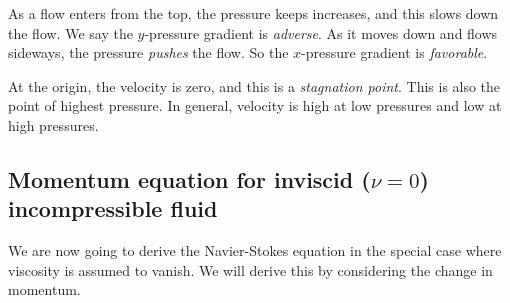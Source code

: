 \documentclass[a4paper]{article}
\begin{document}
\begin{eg}
\begin{center}
  \end{center}
  As a flow enters from the top, the pressure keeps increases, and this slows down the flow. We say the $y$-pressure gradient is \emph{adverse}. As it moves down and flows sideways, the pressure \emph{pushes} the flow. So the $x$-pressure gradient is \emph{favorable}.

  At the origin, the velocity is zero, and this is a \emph{stagnation point}. This is also the point of highest pressure. In general, velocity is high at low pressures and low at high pressures.
\end{eg}

\subsection{Momentum equation for inviscid (\texorpdfstring{$\nu = 0$}{nu = 0}) incompressible fluid}
We are now going to derive the Navier-Stokes equation in the special case where viscosity is assumed to vanish. We will derive this by considering the change in momentum.
\end{document}

